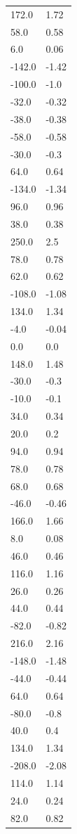 \begin{longtable}{ll}
172.0 & 1.72 \\
58.0 & 0.58 \\
6.0 & 0.06 \\
-142.0 & -1.42 \\
-100.0 & -1.0 \\
-32.0 & -0.32 \\
-38.0 & -0.38 \\
-58.0 & -0.58 \\
-30.0 & -0.3 \\
64.0 & 0.64 \\
-134.0 & -1.34 \\
96.0 & 0.96 \\
38.0 & 0.38 \\
250.0 & 2.5 \\
78.0 & 0.78 \\
62.0 & 0.62 \\
-108.0 & -1.08 \\
134.0 & 1.34 \\
-4.0 & -0.04 \\
0.0 & 0.0 \\
148.0 & 1.48 \\
-30.0 & -0.3 \\
-10.0 & -0.1 \\
34.0 & 0.34 \\
20.0 & 0.2 \\
94.0 & 0.94 \\
78.0 & 0.78 \\
68.0 & 0.68 \\
-46.0 & -0.46 \\
166.0 & 1.66 \\
8.0 & 0.08 \\
46.0 & 0.46 \\
116.0 & 1.16 \\
26.0 & 0.26 \\
44.0 & 0.44 \\
-82.0 & -0.82 \\
216.0 & 2.16 \\
-148.0 & -1.48 \\
-44.0 & -0.44 \\
64.0 & 0.64 \\
-80.0 & -0.8 \\
40.0 & 0.4 \\
134.0 & 1.34 \\
-208.0 & -2.08 \\
114.0 & 1.14 \\
24.0 & 0.24 \\
82.0 & 0.82 \\

\end{longtable}
